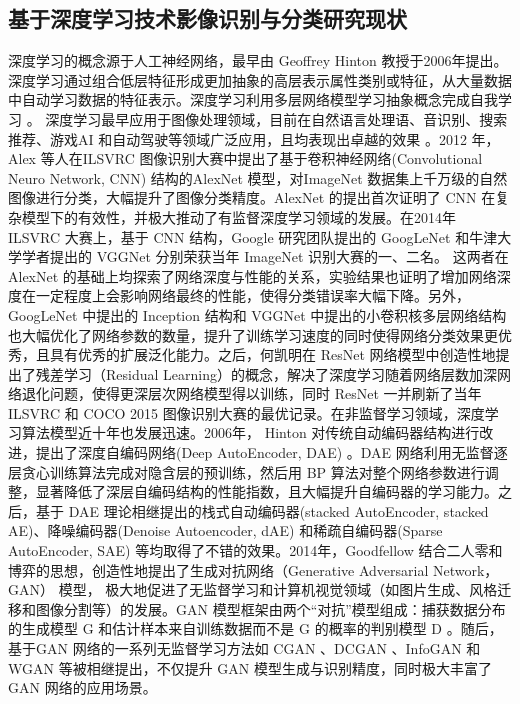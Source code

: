 \subsection{基于深度学习技术影像识别与分类研究现状}
\label{subsec:1-2-2}
深度学习的概念源于人工神经网络，最早由 Geoffrey Hinton \cite{hinton2006fast} 教授于2006年提出。深度学习通过组合低层特征形成更加抽象的高层表示属性类别或特征，从大量数据中自动学习数据的特征表示。深度学习利用多层网络模型学习抽象概念完成自我学习 \cite{lecun2015deep}。 深度学习最早应用于图像处理领域，目前在自然语言处理语、音识别、搜索推荐、游戏AI 和自动驾驶等领域广泛应用，且均表现出卓越的效果 \cite{bengio2009learning}。2012 年，Alex 等人在ILSVRC 图像识别大赛中提出了基于卷积神经网络(Convolutional Neuro Network, CNN) 结构的AlexNet \cite{NIPS2012_4824} 模型，对ImageNet 数据集上千万级的自然图像进行分类，大幅提升了图像分类精度。AlexNet 的提出首次证明了 CNN 在复杂模型下的有效性，并极大推动了有监督深度学习领域的发展。在2014年 ILSVRC 大赛上，基于 CNN 结构，Google 研究团队提出的 GoogLeNet \cite{szegedy2015going} 和牛津大学学者提出的 VGGNet \cite{simonyan2014very} 分别荣获当年 ImageNet 识别大赛的一、二名。 这两者在 AlexNet 的基础上均探索了网络深度与性能的关系，实验结果也证明了增加网络深度在一定程度上会影响网络最终的性能，使得分类错误率大幅下降。另外，GoogLeNet 中提出的 Inception 结构和 VGGNet 中提出的小卷积核多层网络结构也大幅优化了网络参数的数量，提升了训练学习速度的同时使得网络分类效果更优秀，且具有优秀的扩展泛化能力。之后，何凯明在 ResNet \cite{he2016deep} 网络模型中创造性地提出了残差学习（Residual Learning）的概念，解决了深度学习随着网络层数加深网络退化问题，使得更深层次网络模型得以训练，同时 ResNet 一并刷新了当年 ILSVRC 和 COCO 2015 图像识别大赛的最优记录。在非监督学习领域，深度学习算法模型近十年也发展迅速。2006年， Hinton 对传统自动编码器结构进行改进，提出了深度自编码网络(Deep AutoEncoder, DAE) \cite{hinton2006fast}。DAE 网络利用无监督逐层贪心训练算法完成对隐含层的预训练，然后用 BP 算法对整个网络参数进行调整，显著降低了深层自编码结构的性能指数，且大幅提升自编码器的学习能力。之后，基于 DAE 理论相继提出的栈式自动编码器(stacked AutoEncoder, stacked AE)\cite{bengio2007greedy}、降噪编码器(Denoise Autoencoder, dAE)\cite{vincent2008extracting} 和稀疏自编码器(Sparse AutoEncoder, SAE)\cite{ng2011sparse} 等均取得了不错的效果。2014年，Goodfellow 结合二人零和博弈的思想，创造性地提出了生成对抗网络（Generative Adversarial Network，GAN）\cite{goodfellow2014generative} 模型， 极大地促进了无监督学习和计算机视觉领域（如图片生成、风格迁移和图像分割等）的发展。GAN 模型框架由两个“对抗”模型组成：捕获数据分布的生成模型 G 和估计样本来自训练数据而不是 G 的概率的判别模型 D 。随后，基于GAN 网络的一系列无监督学习方法如 CGAN\cite{mirza2014conditional} 、DCGAN \cite{radford2015unsupervised} 、InfoGAN \cite{chen2016infogan} 和 WGAN \cite{arjovsky2017wasserstein} 等被相继提出，不仅提升 GAN 模型生成与识别精度，同时极大丰富了GAN 网络的应用场景。

